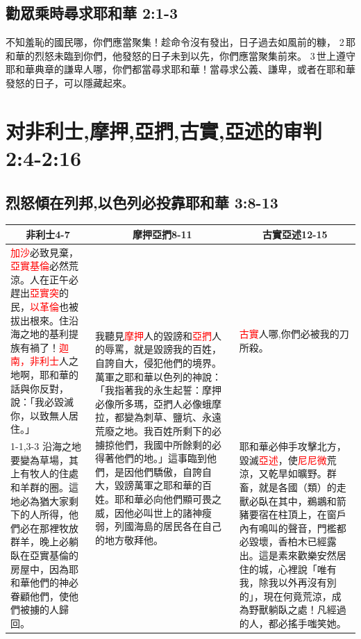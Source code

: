 \subsection{勸眾乘時尋求耶和華 2:1-3}
不知羞恥的國民哪，你們應當聚集！趁命令沒有發出，日子過去如風前的糠， 2 耶和華的烈怒未臨到你們，他發怒的日子未到以先，你們應當聚集前來。 3 世上遵守耶和華典章的謙卑人哪，你們都當尋求耶和華！當尋求公義、謙卑，或者在耶和華發怒的日子，可以隱藏起來。

\section{对非利士,摩押,亞捫,古實,亞述的审判 2:4-2:16}
\subsection{烈怒傾在列邦,以色列必投靠耶和華 3:8-13}
\begin{table}[H]
\centering
\begin{tabular}{p{5.75cm}|p{6cm}|p{5.5cm}}\hline\hline
\multicolumn{1}{c|}{非利士4-7}&\multicolumn{1}{c}{摩押亞捫8-11}&\multicolumn{1}{c}{古實亞述12-15}\\\hline
\textcolor{red}{加沙}必致見棄，\textcolor{red}{亞實基倫}必然荒涼。人在正午必趕出\textcolor{red}{亞實突}的民，\textcolor{red}{以革倫}也被拔出根來。住沿海之地的基利提族有禍了！\textcolor{red}{迦南，非利士}人之地啊，耶和華的話與你反對，說：「我必毀滅你，以致無人居住。」
&\multirow{2}{6.2cm}{我聽見\textcolor{red}{摩押}人的毀謗和\textcolor{red}{亞捫}人的辱罵，就是毀謗我的百姓，自誇自大，侵犯他們的境界。萬軍之耶和華以色列的神說：「我指著我的永生起誓：摩押必像所多瑪，亞捫人必像蛾摩拉，都變為刺草、鹽坑、永遠荒廢之地。我百姓所剩下的必擄掠他們，我國中所餘剩的必得著他們的地。」這事臨到他們，是因他們驕傲，自誇自大，毀謗萬軍之耶和華的百姓。耶和華必向他們顯可畏之威，因他必叫世上的諸神瘦弱，列國海島的居民各在自己的地方敬拜他。}
&\textcolor{red}{古實}人哪,你們必被我的刀所殺。\\\cline{1-1,3-3}
沿海之地要變為草場，其上有牧人的住處和羊群的圈。這地必為猶大家剩下的人所得，他們必在那裡牧放群羊，晚上必躺臥在亞實基倫的房屋中，因為耶和華他們的神必眷顧他們，使他們被擄的人歸回。&&耶和華必伸手攻擊北方，毀滅\textcolor{red}{亞述}，使\textcolor{red}{尼尼微}荒涼，又乾旱如曠野。群畜，就是各國（類）的走獸必臥在其中，鵜鶘和箭豬要宿在柱頂上，在窗戶內有鳴叫的聲音，門檻都必毀壞，香柏木已經露出。這是素來歡樂安然居住的城，心裡說「唯有我，除我以外再沒有別的」，現在何竟荒涼，成為野獸躺臥之處！凡經過的人，都必搖手嗤笑她。\\\hline
\end{tabular}
\end{table}



